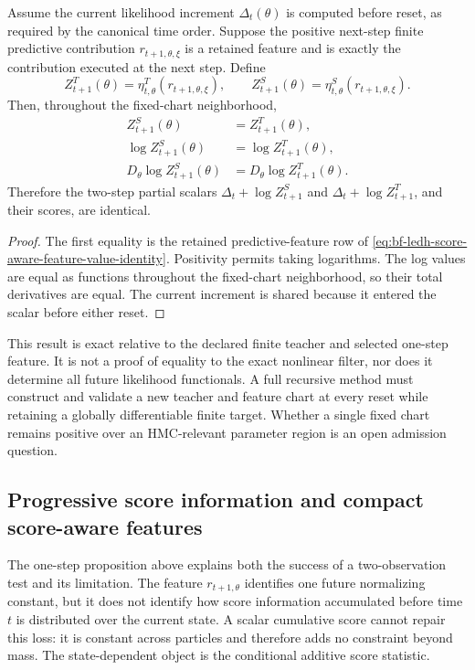 \begin{proposition}
\label{prop:bf-ledh-score-aware-next-score}
Assume the current likelihood increment \(\Delta_t(\theta)\) is computed before
reset, as required by the canonical time order.  Suppose the positive
next-step finite predictive contribution \(r_{t+1,\theta,\xi}\) is a retained
feature and is exactly the contribution executed at the next step.  Define
\[
  Z^T_{t+1}(\theta)
  =\eta^T_{t,\theta}(r_{t+1,\theta,\xi}),\qquad
  Z^S_{t+1}(\theta)
  =\eta^S_{t,\theta}(r_{t+1,\theta,\xi}).
\]
Then, throughout the fixed-chart neighborhood,
\begin{align}
  Z^S_{t+1}(\theta)&=Z^T_{t+1}(\theta),\\
  \log Z^S_{t+1}(\theta)&=\log Z^T_{t+1}(\theta),\\
  D_\theta\log Z^S_{t+1}(\theta)
    &=D_\theta\log Z^T_{t+1}(\theta).
\end{align}
Therefore the two-step partial scalars
\(\Delta_t+\log Z^S_{t+1}\) and
\(\Delta_t+\log Z^T_{t+1}\), and their scores, are identical.
\end{proposition}

\begin{proof}
The first equality is the retained predictive-feature row of
\eqref{eq:bf-ledh-score-aware-feature-value-identity}.  Positivity permits
taking logarithms.  The log values are equal as functions throughout the
fixed-chart neighborhood, so their total derivatives are equal.  The current
increment is shared because it entered the scalar before either reset.
\end{proof}

This result is exact relative to the declared finite teacher and selected
one-step feature.  It is not a proof of equality to the exact nonlinear filter,
nor does it determine all future likelihood functionals.  A full recursive
method must construct and validate a new teacher and feature chart at every
reset while retaining a globally differentiable finite target.  Whether a
single fixed chart remains positive over an HMC-relevant parameter region is an
open admission question.

\subsection{Progressive score information and compact score-aware features}
\label{sec:bf-ledh-tp-progressive-score-features}

The one-step proposition above explains both the success of a two-observation
test and its limitation.  The feature \(r_{t+1,\theta}\) identifies one future
normalizing constant, but it does not identify how score information accumulated
before time \(t\) is distributed over the current state.  A scalar cumulative
score cannot repair this loss: it is constant across particles and therefore
adds no constraint beyond mass.  The state-dependent object is the conditional
additive score statistic.

